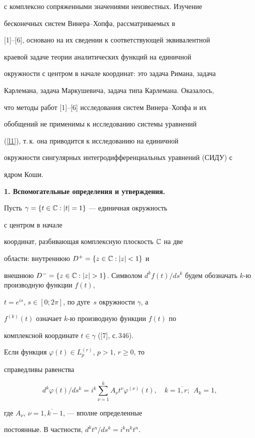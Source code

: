 с комплексно сопряженными значениями неизвестных. Изучение


бесконечных систем Винера--Хопфа, рассматриваемых в 


[1]--[6], основано на их сведении к соответствующей эквивалентной


краевой задаче теории аналитических функций на единичной


окружности с центром в начале координат: это задача Римана, задача


Карлемана, задача Маркушевича, задача типа Карлемана. Оказалось,


что методы работ [1]--[6] исследования систем Винера--Хопфа и их


обобщений не применимы к исследованию системы уравнений


(\ref{l1}), т.\,к. она приводится к исследованию на единичной


окружности сингулярных интегродифференциальных уравнений (СИДУ) с


ядром Коши.


\medskip





{\bf 1. Вспомогательные определения и утверждения.}


Пусть $\gamma=\{ t \in \Bbb{C}:|t|=1\}$ --- единичная окружность 


с центром в начале


координат, разбивающая комплексную плоскость $\Bbb{C}$ на две


области: внутреннюю $D^+=\{ z\in \Bbb{C}:|z|<1\}$  и


внешнюю $D^-=\{z\in \Bbb{C}:|z|>1\}$. Символом $d^k


f(t)/ds^k$ будем обозначать $k$-ю производную функции $f(t)$,


$t=e^{is}$, $s\in [0;2\pi]$, по дуге~$s$ окружности $\gamma$, а


$f^{(k)}(t)$ означает $k$-ю производную функции $f(t)$ по


комплексной координате $t \in \gamma$ ([7], с.\,346).








\begin{lem}


Если функция $\varphi(t) \in L_p^{(r)}$, $p>1$, $r \geqslant 0$, то


справедливы равенства


$$


d^k\varphi(t)/ds^k=i^k\sum_{\nu=1}^k A_\nu t^\nu \varphi^{(\nu)}(t),


\quad k=\overline{1,r};\ \ A_k=1,


$$


где $A_\nu$, $\nu = \overline{1,k-1}$, --- вполне определенные


постоянные. В частности, $d^kt^n / ds^k=i^kn^kt^n$.


\end{lem}





